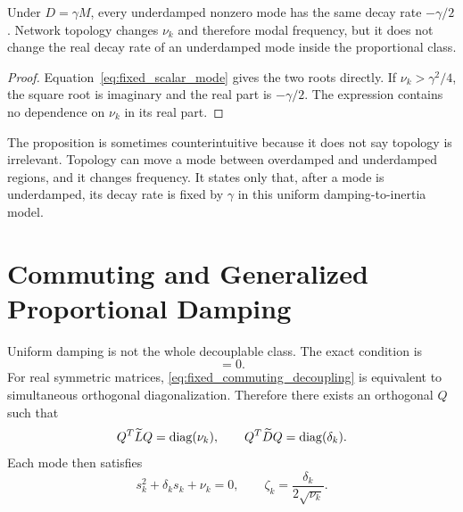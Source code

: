 \begin{proposition}
Under \(D=\gamma M\), every underdamped nonzero mode has the same decay rate
\(-\gamma/2\). Network topology changes \(\nu_k\) and therefore modal
frequency, but it does not change the real decay rate of an underdamped mode
inside the proportional class.
\end{proposition}

\begin{proof}
Equation~\eqref{eq:fixed_scalar_mode} gives the two roots directly. If
\(\nu_k>\gamma^2/4\), the square root is imaginary and the real part is
\(-\gamma/2\). The expression contains no dependence on \(\nu_k\) in its real
part.
\end{proof}

The proposition is sometimes counterintuitive because it does not say topology
is irrelevant. Topology can move a mode between overdamped and underdamped
regions, and it changes frequency. It states only that, after a mode is
underdamped, its decay rate is fixed by \(\gamma\) in this uniform
damping-to-inertia model.

\section{Commuting and Generalized Proportional Damping}

Uniform damping is not the whole decouplable class. The exact condition is
\begin{equation}
  [\Lt,\Dt]=0.
  \label{eq:fixed_commuting_decoupling}
\end{equation}
For real symmetric matrices, \eqref{eq:fixed_commuting_decoupling} is
equivalent to simultaneous orthogonal diagonalization. Therefore there exists
an orthogonal \(Q\) such that
\begin{equation}
  Q^T\widetilde L Q=\operatorname{diag}(\nu_k),
  \qquad
  Q^T\widetilde D Q=\operatorname{diag}(\delta_k).
  \label{eq:fixed_simultaneous_diagonalization}
\end{equation}
Each mode then satisfies
\begin{equation}
  s_k^2+\delta_k s_k+\nu_k=0,
  \qquad
  \zeta_k=\frac{\delta_k}{2\sqrt{\nu_k}}.
  \label{eq:fixed_commuting_scalar_modes}
\end{equation}

